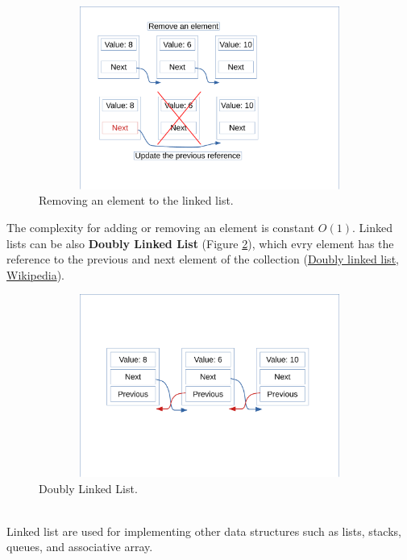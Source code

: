 \newpage
\begin{figure}[]
	\includegraphics[width=14cm,height=6cm]{chapters/datastructures/images/linked_list_3.pdf}
	\caption[]{Removing an element to the linked list.}
	\label{linked_list_3}
\end{figure}
The complexity for adding or removing an element is constant \(O(1)\).
Linked lists can be also \textbf{Doubly Linked List} (Figure \ref{linked_list_4}), which evry element has the reference to the previous and next element of the collection \cite{wikidoublylinkedlist} (\href{https://en.wikipedia.org/wiki/Doubly_linked_list}{Doubly linked list, Wikipedia}).
\begin{figure}[hb]
	\includegraphics[width=14cm,height=6cm]{chapters/datastructures/images/linked_list_4.pdf}
	\caption[]{Doubly Linked List.}
	\label{linked_list_4}
\end{figure} 
\\
Linked list are used for implementing other data structures such as lists, stacks, queues, and associative array.
\newpage
